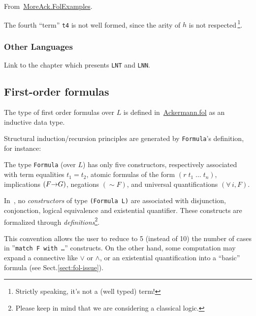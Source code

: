 From~\href{../theories/html/hydras.MoreAck.FolExamples.html}{MoreAck.FolExamples}.



\begin{remark}
The fourth ``term'' \texttt{t4} is not well formed, since the arity of $h$ is not respected\,\footnote{Strictly speaking, it's not a (well typed) term!}.
\end{remark}

\subsubsection{Other Languages}

\begin{todo}
Link to the chapter which presents \texttt{LNT} and \texttt{LNN}.
\end{todo}

\subsection{First-order formulas}



The type of first order formulas over $L$ is defined 
in~\href{../theories/html/hydras.Ackermann.fol.html}{Ackermann.fol} as an inductive data type.



Structural induction/recursion principles are generated by 
\texttt{Formula}'s definition, for instance:


\begin{remark}
The type \texttt{Formula} (over $L$) has only five constructors,
respectively associated with term equalities $t_1=t_2$, atomic formulas of the form $(r\;t_1\;\dots\;t_n)$, implications $(F \mbox{$\rightarrow$} G)$, negations $({\sim}F)$, and universal quantifications $(\forall\,i, F)$.  

In~\cite{Goedel}, no \emph{constructors} of type \texttt{(Formula L)} are associated with
disjunction, conjonction, logical equivalence and existential quantifier. These constructs are formalized through \emph{definitions}\footnote{Please keep in mind that we are considering a classical logic.}.


This convention allows the user to reduce to 5 (instead of 10) the number of cases in ''\texttt{match F with \dots}'' constructs. On the other hand, some computation may expand a connective like $\vee$ or
$\wedge$, or an existential quantification into a ``basic'' formula (see Sect.\vref{sect:fol-issue}).
\end{remark}

